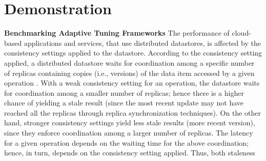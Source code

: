\documentclass[conference]{IEEEtran}
\begin{document}

\section{Demonstration}
 \textbf{Benchmarking Adaptive Tuning Frameworks}
  The performance of cloud-based applications and services, that use distributed datastores, is affected by the consistency
 settings applied to the datastore. According to the consistency setting applied, a distributed datastore waits for coordination
     among a specific number of replicas containing copies (i.e., versions) of the data item accessed by a given operation \cite{conf/sigmod/Sivasubramanian12}. %
      With a weak consistency
  setting for an operation, the datastore waits for coordination among  a smaller number of replicas; hence there is a higher chance of yielding
   a stale result (since the most recent update may not have reached all the replicas through replica synchronization techniques).
   On the other hand, stronger consistency settings yield less stale results (more recent version), since they enforce coordination among a larger number of replicas.
    The latency for
      a given operation depends on the waiting time for the above coordination; hence, in turn, depends on the
       consistency setting applied. %
 Thus, both staleness
\end{document}
